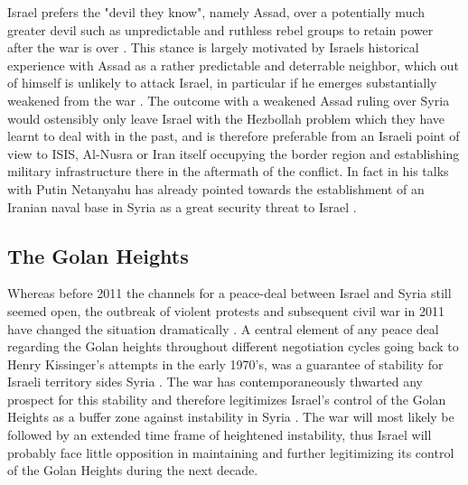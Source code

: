 \documentclass[a4paper]{article}\twocolumn
\begin{document}
Israel prefers the "devil they know", namely Assad, over a potentially much greater devil such as unpredictable and ruthless rebel groups to retain power after the war is over \cite{timesofisrael_2013,Hanauer2015}. This stance is largely motivated by Israels historical experience with Assad as a rather predictable and deterrable neighbor, which out of himself is unlikely to attack Israel, in particular if he emerges substantially weakened from the war \cite{Hanauer2015}. The outcome with a weakened Assad ruling over Syria would ostensibly only leave Israel with the Hezbollah problem which they have learnt to deal with in the past, and is therefore preferable from an Israeli point of view to ISIS, Al-Nusra or Iran itself occupying the border region and establishing military infrastructure there in the aftermath of the conflict. In fact in his talks with Putin Netanyahu has already pointed towards the establishment of an Iranian naval base in Syria as a great security threat to Israel \cite{ravid_2017}.

\subsection{The Golan Heights}
Whereas before 2011 the channels for a peace-deal between Israel and Syria still seemed open, the outbreak of violent protests and subsequent civil war  in 2011 have changed the situation dramatically \cite{Hanauer2015}. A central element of any peace deal regarding the Golan heights throughout different negotiation cycles going back to Henry Kissinger's attempts in the early 1970's, was a guarantee of stability for Israeli territory sides Syria \cite{Rabinovich2012}. The war has contemporaneously thwarted any prospect for this stability and therefore legitimizes Israel's control of the Golan Heights as a buffer zone against instability in Syria \cite{Hanauer2015,Rabinovich2012}. The war will most likely be followed by an extended time frame of heightened instability, thus Israel will probably face little opposition in maintaining and further legitimizing its control of the Golan Heights during the next decade. 
\end{document}
